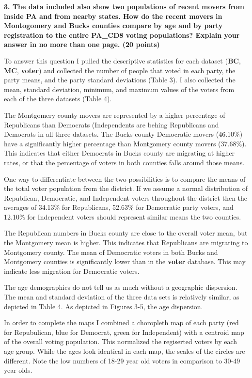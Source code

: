 \documentclass[12pt]{article}
\begin{document}
\noindent \textbf{3.  The data included also show two populations of recent movers from inside PA and from nearby states.  How do the recent movers in Montogomery and Bucks counties compare by age and by party registration to the entire PA\_CD8 voting populations?  Explain your answer in no more than one page. (20 points)}

To answer this question I pulled the descriptive statistics for each dataset (\textbf{BC}, \textbf{MC}, \textbf{voter}) and collected the number of people that voted in each party, the party means, and the party standard deviations (Table 3).  I also collected the mean, standard deviation, minimum, and maximum values of the voters from each of the three datasets (Table 4).

The Montgomery county movers are represented by a higher percentage of Republicans than Democrats (Independents are behing Republicans and Democrats in all three datasets.  The Bucks county Democratic movers (46.10\%) have a significantly higher percentage than Montgomery county movers (37.68\%).  This indicates that either Democrats in Bucks county are migrating at higher rates, or that the percentage of voters in both counties falls around those means.

One way to differentiate between the two possibilities is to compare the means of the total voter population from the district.  If we assume a normal distribution of Republican, Democratic, and Independent voters throughout the district then the averages of 34.13\% for Republicans, 52.63\% for Democratic party voters, and 12.10\% for Independent voters should represent similar means the two counties.  

The Republican numbers in Bucks county are close to the overall voter mean, but the Montgomery mean is higher.  This indicates that Republicans are migrating to Montgomery county.  The mean of Democratic voters in both Bucks and Montgomery counties is significantly lower than in the \textbf{voter} database.  This may indicate less migration for Democratic voters.

The age demographics do not tell us as much without a geographic dispersion.  The mean and standard deviation of the three data sets is relatively similar, as depicted in Table 4.  As depicted in Figures 3-5, the age dispersion.  

In order to complete the maps I combined a choropleth map of each party (red for Repubulican, blue for Democrat, green for Independent) with a centroid map of the overall voting population.  This normalized the regiserted voters by each age group.  While the ages look identical in each map, the scales of the circles are different.  Note the low numbers of 18-29 year old voters in comparison to 30-49 year olds.
\end{document}
